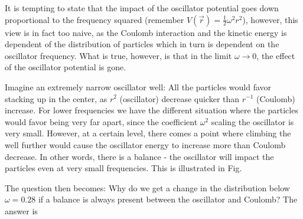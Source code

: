 It is tempting to state that the impact of the oscillator potential goes down proportional to the frequency squared (remember $V(\vec r) = \frac{1}{2}\omega^2r^2$), however, this view is in fact too naive, as the Coulomb interaction and the kinetic energy is dependent of the distribution of particles which in turn is dependent on the oscillator frequency. What is true, however, is that in the limit $\omega\to 0$, the effect of the oscillator potential is gone. 

Imagine an extremely narrow oscillator well: All the particles would favor stacking up in the center, as $r^2$ (oscillator) decrease quicker than $r^{-1}$ (Coulomb) increase. For lower frequencies we have the different situation where the particles would favor being very far apart, since the coefficient $\omega^2$ scaling the oscillator is very small. However, at a certain level, there comes a point where climbing the well further would cause the oscillator energy to increase more than Coulomb decrease. In other words, there is a balance - the oscillator will impact the particles even at very small frequencies. This is illustrated in Fig.

The question then becomes: Why do we get a change in the distribution below $\omega=0.28$ if a balance is always present between the oscillator and Coulomb? The answer is 

